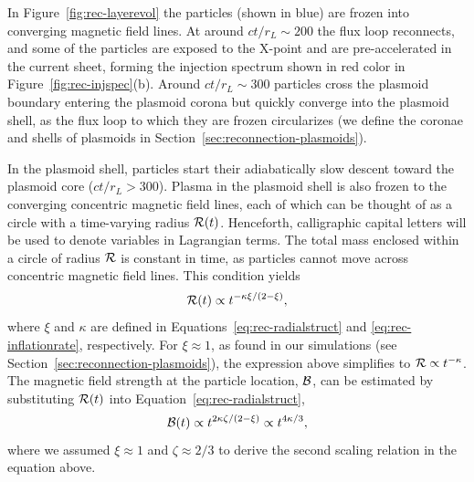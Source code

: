 In Figure~\ref{fig:rec-layerevol} the particles (shown in blue) are frozen into converging magnetic field lines. At around $ct/r_L\sim 200$ the flux loop reconnects, and some of the particles are exposed to the X-point and are pre-accelerated in the current sheet, forming the injection spectrum shown in red color in Figure~\ref{fig:rec-injspec}(b). Around $ct/r_L\sim 300$ particles cross the plasmoid boundary entering the plasmoid corona but quickly converge into the plasmoid shell, as the flux loop to which they are frozen circularizes (we define the coronae and shells of plasmoids in Section~\ref{sec:reconnection-plasmoids}).

In the plasmoid shell, particles start their adiabatically slow descent toward the plasmoid core ($ct/r_L > 300$). Plasma in the plasmoid shell is also frozen to the converging concentric magnetic field lines, each of which can be thought of as a circle with a time-varying radius $\mathcal{R}(t)$. Henceforth, calligraphic capital letters will be used to denote variables in Lagrangian terms. The total mass enclosed within a circle of radius $\mathcal{R}$ is constant in time, as particles cannot move across concentric magnetic field lines. This condition yields
\begin{equation}
    \label{eq:rec-rL_vs_t}
    \mathcal{R}(t)\propto t^{-\kappa\xi/(2-\xi)},
\end{equation}
where $\xi$ and $\kappa$ are defined in Equations~\eqref{eq:rec-radialstruct} and \eqref{eq:rec-inflationrate}, respectively. For $\xi\approx 1$, as found in our simulations (see Section~\ref{sec:reconnection-plasmoids}), the expression above simplifies to $\mathcal{R} \propto t^{-\kappa}$. The magnetic field strength at the particle location, $\mathcal{B}$, can be estimated by substituting $\mathcal{R}(t)$ into Equation~\eqref{eq:rec-radialstruct},
\begin{equation}
    \label{eq:rec-BL_vs_t}
    \mathcal{B}(t)\propto t^{2\kappa \zeta/(2-\xi)}\propto t^{4\kappa/3},
\end{equation}
where we assumed $\xi\approx 1$ and $\zeta\approx 2/3$ to derive the second scaling relation in the equation above.



